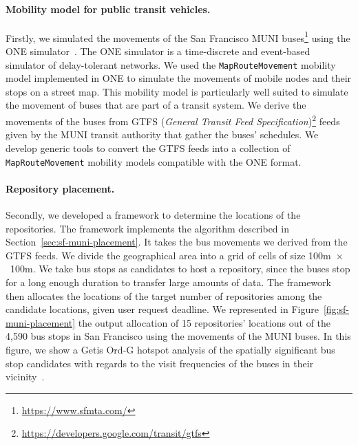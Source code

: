 \paragraph{Mobility model for public transit vehicles.} Firstly, we simulated the movements of the San Francisco MUNI buses\footnote{\url{https://www.sfmta.com/}} using the ONE simulator~\cite{keranen2009one}. The ONE simulator is a time-discrete and event-based simulator of delay-tolerant networks. We used the \texttt{MapRouteMovement} mobility model implemented in ONE to simulate the movements of mobile nodes and their stops on a street map. This mobility model is particularly well suited to simulate the movement of buses that are part of a transit system. We derive the movements of the buses from GTFS (\textit{General Transit Feed Specification})\footnote{\url{https://developers.google.com/transit/gtfs}} feeds given by the MUNI transit authority that gather the buses' schedules. We develop generic tools to convert the GTFS feeds into a collection of \texttt{MapRouteMovement} mobility models compatible with the ONE format.

\paragraph{Repository placement.} Secondly, we developed a framework to determine the locations of the repositories. The framework implements the algorithm described in Section~\ref{sec:sf-muni-placement}. It takes the bus movements we derived from the GTFS feeds. We divide the geographical area into a grid of cells of size 100m~$\times$~100m. We take bus stops as candidates to host a repository, since the buses stop for a long enough duration to transfer large amounts of data. The framework then allocates the locations of the target number of repositories among the candidate locations, given user request deadline. We represented in Figure~\ref{fig:sf-muni-placement} the output allocation of 15 repositories' locations out of the 4,590 bus stops in San Francisco using the movements of the MUNI buses. In this figure, we show a Getis Ord-G hotspot analysis of the spatially significant bus stop candidates with regards to the visit frequencies of the buses in their vicinity~\cite{getis1992analysis}.


